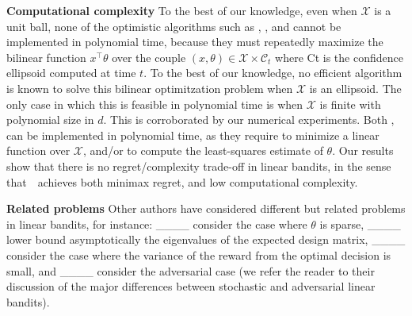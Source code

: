 \textbf{Computational complexity} To the best of our knowledge, even when $\mathcal{X}$ is a unit ball, none of the optimistic algorithms such as , ,  and  cannot be implemented in polynomial time, because they must repeatedly maximize the bilinear function $x^\top \theta$ over the couple  $(x,\theta) \in \mathcal{X} \times \mathcal{C}_t$ where \gls{Ct} is the confidence ellipsoid computed at time $t$. 
To the best of our knowledge, no efficient algorithm is known to solve this bilinear optimitzation problem when $\mathcal{X}$ is an ellipsoid. 
The only case in which this is feasible in polynomial time is when $\mathcal{X}$ is finite with polynomial size in $d$. 
This is corroborated by our numerical experiments. 
Both ,  can be implemented in polynomial time, as they require to minimize a linear function over $\mathcal{X}$, and/or to compute the least-squares estimate of $\theta$. 
Our results show that there is no regret/complexity trade-off in linear bandits, in the sense that~\nous~achieves both minimax regret, and low computational complexity.  

\textbf{Related problems} 
Other authors have considered different but related problems in linear bandits, for
instance: ____ consider the case where $\theta$ is sparse,
____ lower bound asymptotically the eigenvalues of the
expected design matrix, ____ consider the case where the variance of the
reward from the optimal decision is small, and ____ consider
the adversarial case (we refer the reader to their discussion of the major differences
between stochastic and adversarial linear bandits).